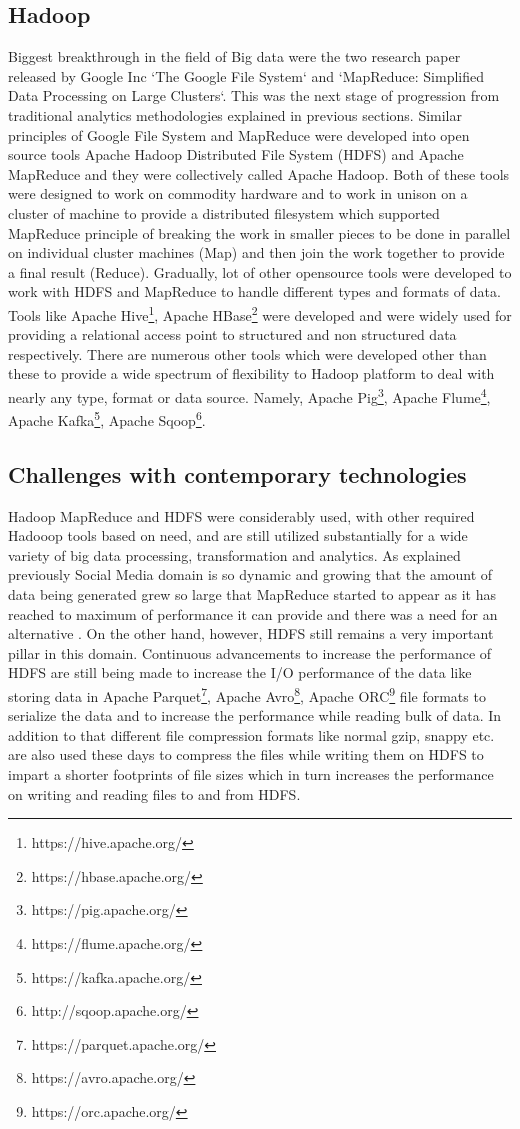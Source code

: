 \documentclass[sigconf]{acmart}
\begin{document}
\subsection{Hadoop}
Biggest breakthrough in the field of Big data were the two research paper released by Google Inc `The Google File System`\cite{ghemawatgoogle} and `MapReduce: Simplified Data Processing on Large Clusters`\cite{mapreducegoogle}. This was the next stage of progression from traditional analytics methodologies explained in previous sections. Similar principles of Google File System and MapReduce were developed into open source tools Apache Hadoop Distributed File System (HDFS) and Apache MapReduce and they were collectively called Apache Hadoop. Both of these tools were designed to work on commodity hardware and to work in unison on a cluster of machine to provide a distributed filesystem which supported MapReduce principle of breaking the work in smaller pieces to be done in parallel on individual cluster machines (Map) and then join the work together to provide a final result (Reduce). Gradually, lot of other opensource tools were developed to work with HDFS and MapReduce to handle different types and formats of data. Tools like Apache Hive\footnote{https://hive.apache.org/}, Apache HBase\footnote{https://hbase.apache.org/} were developed and were widely used for providing a relational access point to structured and non structured data respectively. There are numerous other tools which were developed other than these to provide a wide spectrum of flexibility to Hadoop platform to deal with nearly any type, format or data source. Namely, Apache Pig\footnote{https://pig.apache.org/}, Apache Flume\footnote{https://flume.apache.org/}, Apache Kafka\footnote{https://kafka.apache.org/}, Apache Sqoop\footnote{http://sqoop.apache.org/}. 
\subsection{Challenges with contemporary technologies}
Hadoop MapReduce and HDFS were considerably used, with other required Hadooop tools based on need, and are still utilized substantially for a wide variety of big data processing, transformation and analytics. As explained previously Social Media domain is so dynamic and growing that the amount of data being generated \cite{fbstats} grew so large that MapReduce started to appear as it has reached to maximum of performance it can provide and there was a need for an alternative \cite{sparkvsmapr}. On the other hand, however, HDFS still remains a very important pillar in this domain. Continuous advancements to increase the performance of HDFS are still being made to increase the I/O performance of the data like storing data in Apache Parquet\footnote{https://parquet.apache.org/}, Apache Avro\footnote{https://avro.apache.org/}, Apache ORC\footnote{https://orc.apache.org/} file formats to serialize the data and to increase the performance while reading bulk of data. In addition to that different file compression formats like normal gzip, snappy etc. are also used these days to compress the files while writing them on HDFS to impart a shorter footprints of file sizes which in turn increases the performance on writing and reading files to and from HDFS\cite{dataformats}.
\end{document}
